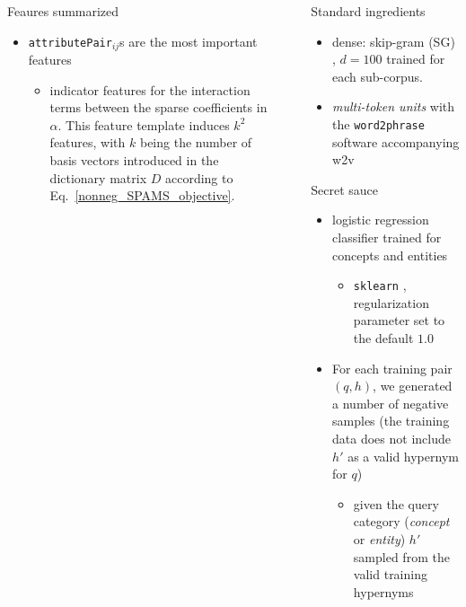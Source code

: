 \documentclass{beamer}
\newlength{\sepwid}
\newlength{\onecolwid}
\newcommand{\bull}[1]{
  \begin{itemize}
    \item #1
  \end{itemize}
}
\begin{document}
\begin{frame}[t]
\begin{columns}[t]
\begin{column}{\onecolwid}
\begin{block}{Feaures summarized}
\begin{itemize}
  \item \texttt{attributePair}$_{ij}$s are the most important features
    \bull{indicator features for the interaction terms between the sparse
    coefficients in $\alpha$.
    This feature template induces $k^2$ features, with $k$ being the number of
    basis vectors introduced in the dictionary matrix $D$ according to
    Eq.~\ref{nonneg_SPAMS_objective}.}
\end{itemize}
\end{block}
\end{column} 

\begin{column}{\sepwid} %
\end{column}   

\begin{column}{\onecolwid}

  \begin{block}{Standard ingredients}
    \begin{itemize}
      \item dense: skip-gram (SG) \citep{Mikolov:2013f}, $d=100$ trained for each
        sub-corpus. 
      \item \emph{multi-token units} with the \texttt{word2phrase}
        software accompanying w2v 
    \end{itemize}
  \end{block}

  \begin{block}{Secret sauce}
    \begin{itemize}
      \item \alert{logistic regression} classifier trained for concepts and
        entities \bull{\texttt{sklearn}
        \citep{Pedregosa:2011},%
        regularization parameter set to the default $1.0$}

      \item For each training pair $(q,h)$, we generated a number of \alert{negative
        samples} (the training data does not include $h'$ as a valid hypernym for
        $q$) 
        \bull{given the query category (\textit{concept} or \textit{entity}) $h'$
        sampled from the valid training hypernyms}


\end{itemize}
\end{block}
\end{column}
\end{columns}
\end{frame}
\end{document}
